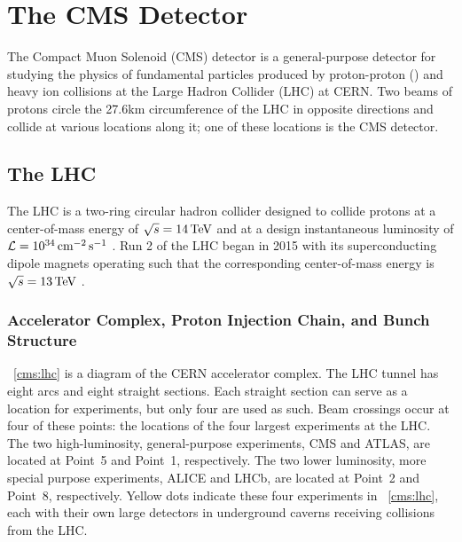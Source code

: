 \chapter{The CMS Detector}

The Compact Muon Solenoid (CMS) detector is a general-purpose detector for studying the physics of fundamental particles produced by proton-proton (\pp) and heavy ion collisions at the Large Hadron Collider (LHC) at CERN.
Two beams of protons circle the 27.6\unit{km} circumference of the LHC in opposite directions and collide at various locations along it; one of these locations is the CMS detector.

\section{The LHC}
The LHC is a two-ring circular hadron collider designed to collide protons at a center-of-mass energy of $\sqrt{s} = 14\,\text{Te\hspace{-.08em}V}$ and at a design instantaneous luminosity of $\mathcal{L} = 10^{34} \,\text{cm}^{-2} \text{\,s}^{-1}$ \cite{Evans:2008zzb}.
Run 2 of the LHC began in 2015 with its superconducting dipole magnets operating such that the corresponding center-of-mass energy is $\sqrt{s} = 13\,\text{Te\hspace{-.08em}V}$ \cite{Todesco:2017tcj}.

\subsection{Accelerator Complex, Proton Injection Chain, and Bunch Structure}
\Fig~\ref{cms:lhc} is a diagram of the CERN accelerator complex.
The LHC tunnel has eight arcs and eight straight sections.
Each straight section can serve as a location for experiments, but only four are used as such.
Beam crossings occur at four of these points: the locations of the four largest experiments at the LHC.
The two high-luminosity, general-purpose experiments, CMS and ATLAS, are located at Point~5 and Point~1, respectively.
The two lower luminosity, more special purpose experiments, ALICE and LHCb, are located at Point~2 and Point~8, respectively.
Yellow dots indicate these four experiments in \Fig~\ref{cms:lhc}, each with their own large detectors in underground caverns receiving collisions from the LHC.

